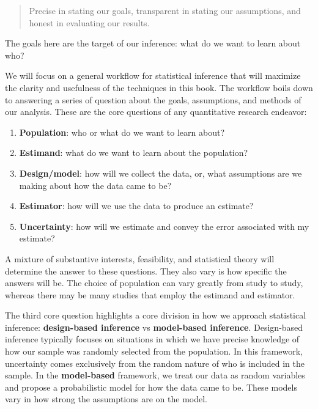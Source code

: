 \documentclass[
  letterpaper,
  DIV=11,
  numbers=noendperiod]{scrreprt}
\providecommand{\tightlist}{%
  \setlength{\itemsep}{0pt}\setlength{\parskip}{0pt}}\usepackage{longtable,booktabs,array}
\theoremstyle{definition}
\theoremstyle{plain}
\theoremstyle{definition}
\theoremstyle{remark}
\begin{document}
\begin{quote}
Precise in stating our goals, transparent in stating our assumptions,
and honest in evaluating our results.
\end{quote}

The goals here are the target of our inference: what do we want to learn
about who?

We will focus on a general workflow for statistical inference that will
maximize the clarity and usefulness of the techniques in this book. The
workflow boils down to answering a series of question about the goals,
assumptions, and methods of our analysis. These are the core questions
of any quantitative research endeavor:

\begin{enumerate}
\def\labelenumi{\arabic{enumi}.}
\tightlist
\item
  \textbf{Population}: who or what do we want to learn about?
\item
  \textbf{Estimand}: what do we want to learn about the population?\\
\item
  \textbf{Design/model}: how will we collect the data, or, what
  assumptions are we making about how the data came to be?
\item
  \textbf{Estimator}: how will we use the data to produce an estimate?
\item
  \textbf{Uncertainty}: how will we estimate and convey the error
  associated with my estimate?
\end{enumerate}

A mixture of substantive interests, feasibility, and statistical theory
will determine the answer to these questions. They also vary is how
specific the answers will be. The choice of population can vary greatly
from study to study, whereas there may be many studies that employ the
estimand and estimator.

The third core question highlights a core division in how we approach
statistical inference: \textbf{design-based inference} vs
\textbf{model-based inference}. Design-based inference typically focuses
on situations in which we have precise knowledge of how our sample was
randomly selected from the population. In this framework, uncertainty
comes exclusively from the random nature of who is included in the
sample. In the \textbf{model-based} framework, we treat our data as
random variables and propose a probabilistic model for how the data came
to be. These models vary in how strong the assumptions are on the model.
\end{document}
